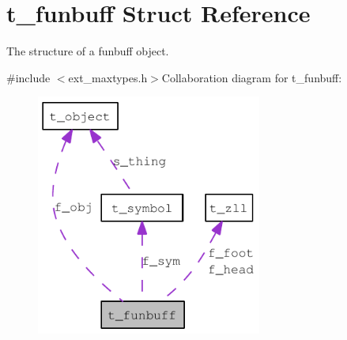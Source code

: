 \hypertarget{structt__funbuff}{
\section{t\_\-funbuff Struct Reference}
\label{structt__funbuff}
}


The structure of a funbuff object.  


{\ttfamily \#include $<$ext\_\-maxtypes.h$>$}Collaboration diagram for t\_\-funbuff:\nopagebreak
\begin{figure}[H]
\begin{center}
\leavevmode
\includegraphics[width=210pt]{structt__funbuff__coll__graph}
\end{center}
\end{figure}
